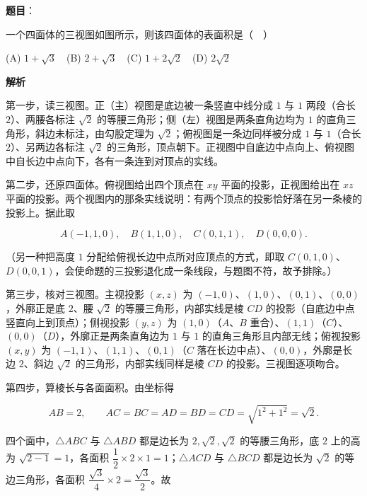 \begin{answer}

\textbf{题目}：

一个四面体的三视图如图所示，则该四面体的表面积是（　）
\nopagebreak[4]
\begin{center}\end{center}
\nopagebreak[4]
(A) \(1+\sqrt{3}\)　(B) \(2+\sqrt{3}\)　(C) \(1+2\sqrt{2}\)　(D) \(2\sqrt{2}\)

\textbf{解析}

第一步，读三视图。正（主）视图是底边被一条竖直中线分成 \(1\) 与 \(1\) 两段（合长 \(2\)）、两腰各标注 \(\sqrt{2}\) 的等腰三角形；侧（左）视图是两条直角边均为 \(1\) 的直角三角形，斜边未标注，由勾股定理为 \(\sqrt{2}\)；俯视图是一条边同样被分成 \(1\) 与 \(1\)（合长 \(2\)）、另两边各标注 \(\sqrt{2}\) 的三角形，顶点朝下。正视图中自底边中点向上、俯视图中自长边中点向下，各有一条连到对顶点的实线。

第二步，还原四面体。俯视图给出四个顶点在 \(xy\) 平面的投影，正视图给出在 \(xz\) 平面的投影。两个视图内的那条实线说明：有两个顶点的投影恰好落在另一条棱的投影上。据此取

\nopagebreak[4]
\[
A(-1,1,0),\quad B(1,1,0),\quad C(0,1,1),\quad D(0,0,0).
\]

（另一种把高度 \(1\) 分配给俯视长边中点所对应顶点的方式，即取 \(C(0,1,0)\)、\(D(0,0,1)\)，会使命题的三投影退化成一条线段，与题图不符，故予排除。）

第三步，核对三视图。主视投影 \((x,z)\) 为 \((-1,0)\)、\((1,0)\)、\((0,1)\)、\((0,0)\)，外廓正是底 \(2\)、腰 \(\sqrt{2}\) 的等腰三角形，内部实线是棱 \(CD\) 的投影（自底边中点竖直向上到顶点）；侧视投影 \((y,z)\) 为 \((1,0)\)（\(A\)、\(B\) 重合）、\((1,1)\)（\(C\)）、\((0,0)\)（\(D\)），外廓正是两条直角边为 \(1\) 与 \(1\) 的直角三角形且内部无线；俯视投影 \((x,y)\) 为 \((-1,1)\)、\((1,1)\)、\((0,1)\)（\(C\) 落在长边中点）、\((0,0)\)，外廓是长边 \(2\)、斜边 \(\sqrt{2}\) 的三角形，内部实线同样是棱 \(CD\) 的投影。三视图逐项吻合。

第四步，算棱长与各面面积。由坐标得

\nopagebreak[4]
\[
AB=2,\qquad AC=BC=AD=BD=CD=\sqrt{1^2+1^2}=\sqrt{2}.
\]

四个面中，\(\triangle ABC\) 与 \(\triangle ABD\) 都是边长为 \(2,\sqrt{2},\sqrt{2}\) 的等腰三角形，底 \(2\) 上的高为 \(\sqrt{2-1}=1\)，各面积 \(\dfrac{1}{2}\times 2\times 1=1\)；\(\triangle ACD\) 与 \(\triangle BCD\) 都是边长为 \(\sqrt{2}\) 的等边三角形，各面积 \(\dfrac{\sqrt{3}}{4}\times 2=\dfrac{\sqrt{3}}{2}\)。故


\end{answer}
